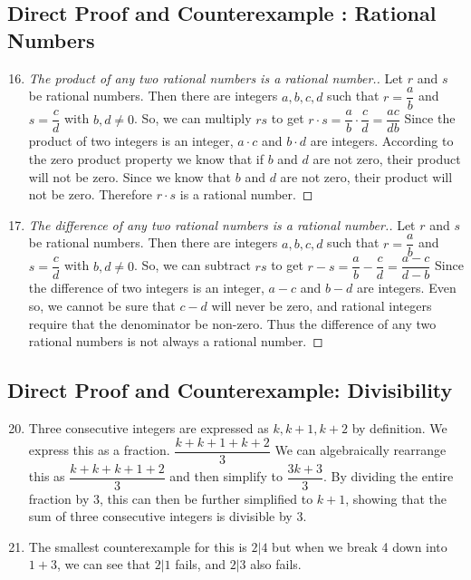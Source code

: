 \documentclass[12pt]{article}
\begin{document}
\subsection{Direct Proof and Counterexample : Rational Numbers} %
\begin{enumerate}
\setcounter{enumi}{15}
\item %
  \begin{proof}[The product of any two rational numbers is a rational number.]
Let $r$ and $s$ be rational numbers. Then there are integers $a,b,c,d$ such that $r = \dfrac{a}{b}$ and $s =
\dfrac{c}{d}$ with $b,d \neq 0$. So, we can multiply $r s$ to get $r \cdot s = \dfrac{a}{b} \cdot \dfrac{c}{d}
= \dfrac{ac}{db}$ Since the product of two integers is an integer, $a \cdot c$ and $b \cdot d$ are
integers. According to the zero product property we know that if $b$ and $d$ are not zero, their product will
not be zero. Since we know that $b$ and $d$ are not zero, their product will not be zero. Therefore $r \cdot
s$ is a rational number.
  \end{proof}

\item %
  \begin{proof}[The difference of any two rational numbers is a rational number.]
Let $r$ and $s$ be rational numbers. Then there are integers $a,b,c,d$ such that $r = \dfrac{a}{b}$ and $s =
\dfrac{c}{d}$ with $b,d \neq 0$. So, we can subtract $r s$ to get $r - s = \dfrac{a}{b} - \dfrac{c}{d}
= \dfrac{a - c}{d - b}$ Since the difference of two integers is an integer, $a - c$ and $b - d$ are
integers. Even so, we cannot be sure that $c - d$ will never be zero, and rational integers require that the
denominator be non-zero. Thus the difference of any two rational numbers is not always a rational number.
  \end{proof}
\end{enumerate}

\subsection{Direct Proof and Counterexample: Divisibility} %
\begin{enumerate}
\setcounter{enumi}{19} %
\item %
  Three consecutive integers are expressed as $k, k+1, k+2$ by definition. We express this as a
  fraction. $\dfrac{k + k + 1 + k + 2}{3}$ We can algebraically rearrange this as $\dfrac{k + k + k + 1 +
    2}{3}$ and then simplify to $\dfrac{3k + 3}{3}$. By dividing the entire fraction by 3, this can then be
  further simplified to $k + 1$, showing that the sum of three consecutive integers is divisible by 3.
  \setcounter{enumi}{26} %
\item %
The smallest counterexample for this is $2|4$ but when we break 4 down into $1+3$, we can see that $2|1$
fails, and $2|3$ also fails.
\end{enumerate}
\end{document}

